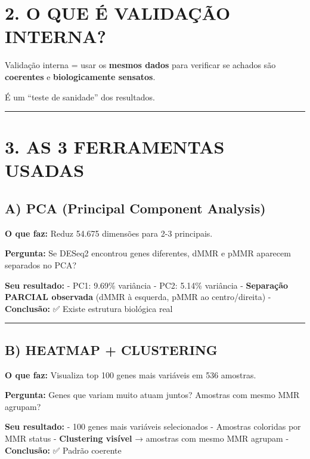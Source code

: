 \documentclass[
]{article}
\begin{document}
\section{2. O QUE É VALIDAÇÃO
INTERNA?}\label{o-que-uxe9-validauxe7uxe3o-interna}

Validação interna = usar os \textbf{mesmos dados} para verificar se
achados são \textbf{coerentes} e \textbf{biologicamente sensatos}.

É um ``teste de sanidade'' dos resultados.

\begin{center}\rule{0.5\linewidth}{0.5pt}\end{center}

\section{3. AS 3 FERRAMENTAS USADAS}\label{as-3-ferramentas-usadas}

\subsection{A) PCA (Principal Component
Analysis)}\label{a-pca-principal-component-analysis}

\textbf{O que faz:} Reduz 54.675 dimensões para 2-3 principais.

\textbf{Pergunta:} Se DESeq2 encontrou genes diferentes, dMMR e pMMR
aparecem separados no PCA?

\textbf{Seu resultado:} - PC1: 9.69\% variância - PC2: 5.14\% variância
- \textbf{Separação PARCIAL observada} (dMMR à esquerda, pMMR ao
centro/direita) - \textbf{Conclusão:} ✅ Existe estrutura biológica real

\begin{center}\rule{0.5\linewidth}{0.5pt}\end{center}

\subsection{B) HEATMAP + CLUSTERING}\label{b-heatmap-clustering}

\textbf{O que faz:} Visualiza top 100 genes mais variáveis em 536
amostras.

\textbf{Pergunta:} Genes que variam muito atuam juntos? Amostras com
mesmo MMR agrupam?

\textbf{Seu resultado:} - 100 genes mais variáveis selecionados -
Amostras coloridas por MMR status - \textbf{Clustering visível} →
amostras com mesmo MMR agrupam - \textbf{Conclusão:} ✅ Padrão coerente
\end{document}
